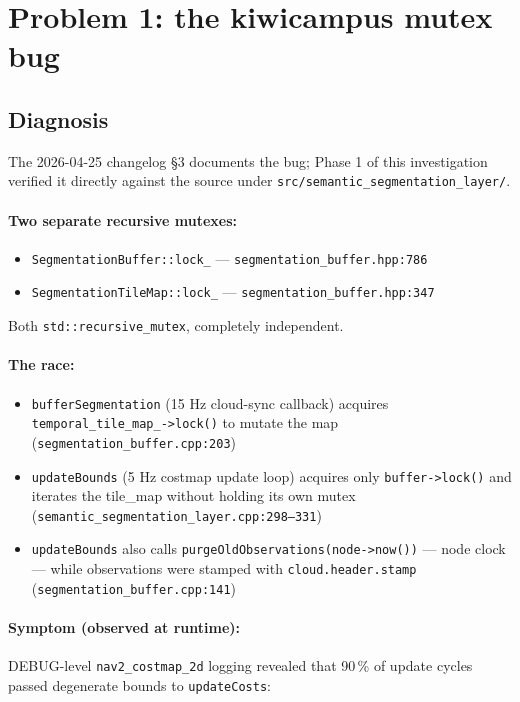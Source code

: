 \documentclass[11pt]{article}
\begin{document}
\section{Problem 1: the kiwicampus mutex bug}

\subsection{Diagnosis}

The 2026-04-25 changelog \S 3 documents the bug; Phase 1 of this investigation
verified it directly against the source under
\texttt{src/semantic\_segmentation\_layer/}.

\paragraph{Two separate recursive mutexes:}
\begin{itemize}[leftmargin=2em,nosep]
\item \texttt{SegmentationBuffer::lock\_} --- \texttt{segmentation\_buffer.hpp:786}
\item \texttt{SegmentationTileMap::lock\_} --- \texttt{segmentation\_buffer.hpp:347}
\end{itemize}

Both \texttt{std::recursive\_mutex}, completely independent.

\paragraph{The race:}
\begin{itemize}[leftmargin=2em,nosep]
\item \texttt{bufferSegmentation} (15 Hz cloud-sync callback) acquires
  \texttt{temporal\_tile\_map\_->lock()} to mutate the map
  (\texttt{segmentation\_buffer.cpp:203})
\item \texttt{updateBounds} (5 Hz costmap update loop) acquires only
  \texttt{buffer->lock()} and iterates the tile\_map without holding its
  own mutex (\texttt{semantic\_segmentation\_layer.cpp:298--331})
\item \texttt{updateBounds} also calls
  \texttt{purgeOldObservations(node->now())} --- node clock --- while
  observations were stamped with \texttt{cloud.header.stamp}
  (\texttt{segmentation\_buffer.cpp:141})
\end{itemize}

\paragraph{Symptom (observed at runtime):}
DEBUG-level \texttt{nav2\_costmap\_2d} logging revealed that 90\,\% of update
cycles passed degenerate bounds to \texttt{updateCosts}:
\end{document}
